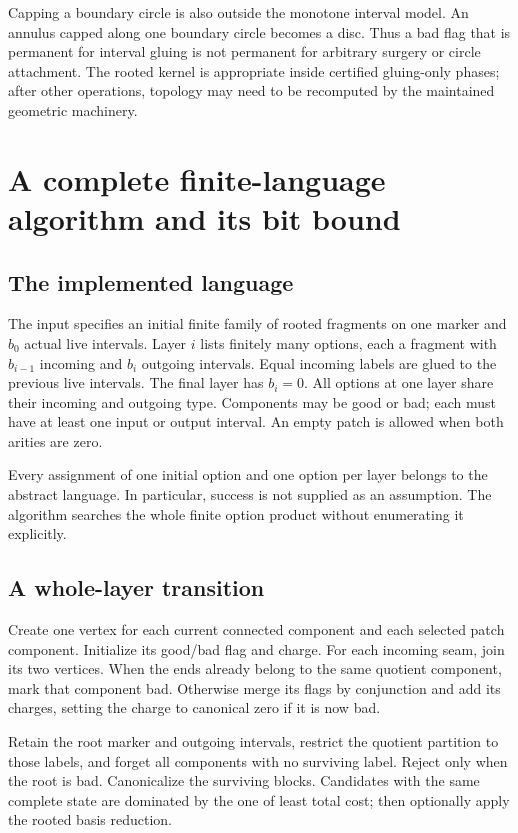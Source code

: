 \documentclass[11pt,letterpaper]{article}
\theoremstyle{definition}
\begin{document}
Capping a boundary circle is also outside the monotone interval model. An annulus capped along one boundary circle becomes a disc. Thus a bad flag that is permanent for interval gluing is not permanent for arbitrary surgery or circle attachment. The rooted kernel is appropriate inside certified gluing-only phases; after other operations, topology may need to be recomputed by the maintained geometric machinery.

\section{A complete finite-language algorithm and its bit bound}
\subsection{The implemented language}
The input specifies an initial finite family of rooted fragments on one marker and $b_0$ actual live intervals. Layer $i$ lists finitely many options, each a fragment with $b_{i-1}$ incoming and $b_i$ outgoing intervals. Equal incoming labels are glued to the previous live intervals. The final layer has $b_i=0$. All options at one layer share their incoming and outgoing type. Components may be good or bad; each must have at least one input or output interval. An empty patch is allowed when both arities are zero.

Every assignment of one initial option and one option per layer belongs to the abstract language. In particular, success is not supplied as an assumption. The algorithm searches the whole finite option product without enumerating it explicitly.

\subsection{A whole-layer transition}
Create one vertex for each current connected component and each selected patch component. Initialize its good/bad flag and charge. For each incoming seam, join its two vertices. When the ends already belong to the same quotient component, mark that component bad. Otherwise merge its flags by conjunction and add its charges, setting the charge to canonical zero if it is now bad.

Retain the root marker and outgoing intervals, restrict the quotient partition to those labels, and forget all components with no surviving label. Reject only when the root is bad. Canonicalize the surviving blocks. Candidates with the same complete state are dominated by the one of least total cost; then optionally apply the rooted basis reduction.
\end{document}
